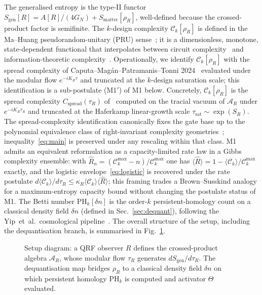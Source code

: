 \documentclass[aps,prd,superscriptaddress,nofootinbib,floatfix,10pt]{revtex4-2}
\theoremstyle{remark}
\newcommand{\Sgen}{S_{\mathrm{gen}}}
\newcommand{\tauR}{\tau_{R}}
\newcommand{\kR}{\kappa_{R}}
\newcommand{\Ck}{\mathcal{C}_{k}}
\newcommand{\PHk}{\mathrm{PH}_{k}}
\newcommand{\dn}{\delta n}
\newcommand{\AR}{\mathcal{A}_{R}}
\begin{document}
The generalised entropy is the type-II functor
$\Sgen[R] = A[R]/(4G_{N}) + S_{\mathrm{matter}}[\rho_{R}]$, well-defined
because the crossed-product factor is semifinite.
The $k$-design complexity $\Ck[\rho_{R}]$ is defined in the
Ma--Huang pseudorandom-unitary (PRU) sense~\cite{MaHuang2025};
it is a dimensionless, monotone, state-dependent functional that
interpolates between circuit complexity~\cite{Haferkamp2022} and
information-theoretic complexity~\cite{CryptoCensorship}.
Operationally, we identify $\Ck[\rho_{R}]$ with the spread complexity of
Caputa--Mag\'an--Patramanis--Tonni 2024~\cite{Caputa2024} evaluated
under the modular flow $e^{-i K_{R}\tau}$ and truncated at the
$k$-design saturation scale; this identification is a sub-postulate
(M1$'$) of M1 below. Concretely, $\Ck[\rho_{R}]$ is the spread complexity
$C_{\mathrm{spread}}(\tauR)$ of~\cite{Caputa2024} computed on the tracial
vacuum of $\AR$ under $e^{-i K_{R}\tauR}$ and truncated at the Haferkamp
linear-growth scale $\tau_{\mathrm{sat}}\sim\exp(S_{R})$.
The spread-complexity identification canonically fixes the gate base up
to the polynomial equivalence class of right-invariant complexity
geometries~\cite{Brown2024Polynomial}; inequality~\eqref{eq:main} is
preserved under any rescaling within that class.
M1 admits an equivalent reformulation as a capacity-limited rate law
in a Gibbs complexity ensemble: with
$\hat{R}_{n} = (\mathcal{C}_{k}^{\max}-n)/\mathcal{C}_{k}^{\max}$ one
has $\langle\hat{R}\rangle = 1-\langle\mathcal{C}_k\rangle/\mathcal{C}_k^{\max}$
exactly, and the logistic envelope~\eqref{eq:logistic} is recovered
under the rate postulate
$d\langle\mathcal{C}_k\rangle/d\tauR \le \kR\langle\mathcal{C}_k\rangle\langle\hat{R}\rangle$;
this framing trades a Brown--Susskind analogy for a maximum-entropy
capacity bound without changing the postulate status of M1.
The Betti number $\PHk[\dn]$ is the order-$k$ persistent-homology count
on a classical density field $\dn$ (defined in Sec.~\ref{sec:dequant}),
following the Yip~et~al.\ cosmological pipeline~\cite{Yip2024}.
The overall structure of the setup, including the dequantisation
branch, is summarised in Fig.~\ref{fig:setup}.

\begin{figure}[htbp]
\centering
{}
\caption{Setup diagram: a QRF observer $R$ defines the crossed-product
algebra $\AR$, whose modular flow $\tauR$ generates $d\Sgen/d\tauR$.
The dequantisation map bridges $\rho_{R}$ to a classical density field
$\dn$ on which persistent homology $\PHk$ is computed and activator
$\Theta$ evaluated.}
\label{fig:setup}
\end{figure}
\end{document}
